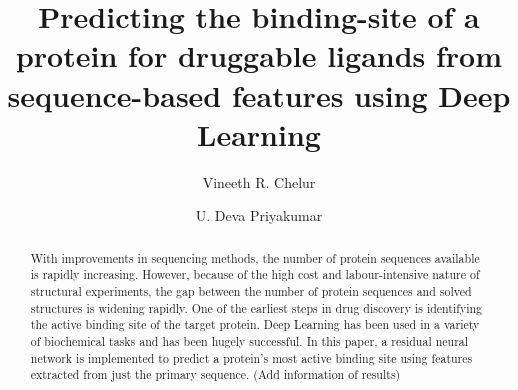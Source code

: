 \documentclass[journal=jacsat,manuscript=article]{achemso}
\author{Vineeth R. Chelur}
\author{U. Deva Priyakumar}
\affiliation[IIIT-H]
{Center for Computational Natural Sciences \& Bioinformatics, IIIT-H, Hyderabad}
\title[Predicting the binding-site of a protein for druggable ligands from sequence-based features using Deep Learning]
  {Predicting the binding-site of a protein for druggable ligands from sequence-based features using Deep Learning
  }
\begin{document}






\begin{abstract}
    With improvements in sequencing methods, the number of protein sequences available is rapidly increasing. However, because of the high cost and labour-intensive nature of structural experiments, the gap between the number of protein sequences and solved structures is widening rapidly. One of the earliest steps in drug discovery is identifying the active binding site of the target protein. Deep Learning has been used in a variety of biochemical tasks and has been hugely successful. In this paper, a residual neural network is implemented to predict a protein's most active binding site using features extracted from just the primary sequence. (Add information of results)
\end{abstract}

\end{document}
